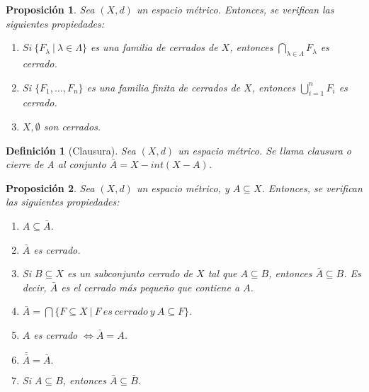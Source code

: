 \documentclass[11pt, a4paper, titlepage]{article}
\theoremstyle{theorem-style}
\newtheorem*{nprop}{Proposición}
\theoremstyle{definition-style}
\newtheorem*{ndef}{Definición}
\theoremstyle{remark-style}
\theoremstyle{example-style}
\newenvironment{nlist}
{\begin{enumerate}
\renewcommand\labelenumi{(\emph{\roman{enumi})}}}
{\end{enumerate}}
\begin{document}
\begin{nprop}
Sea $(X,d)$ un espacio métrico. Entonces, se verifican las siguientes propiedades:

\begin{nlist}
\item $Si\ \{F_\lambda \ | \ \lambda \in \Lambda \}$ es una familia de cerrados de $X$, entonces $\displaystyle \bigcap_{\lambda \in \Lambda} F_\lambda$ es cerrado.

\item Si $\{F_1,\dots, F_n\}$ es una familia finita de cerrados de $X$, entonces $\displaystyle \bigcup_{i=1}^n F_i$ es cerrado.

\item $X,\emptyset$ son cerrados.
\end{nlist}

\end{nprop}



\begin{ndef}[Clausura]
Sea $(X,d)$ un espacio métrico. Se llama \textit{clausura o cierre de A} al conjunto $\bar{A} = X - int(X-A)$.
\end{ndef}



\begin{nprop}
Sea $(X,d)$ un espacio métrico, y $A\subseteq X$. Entonces, se verifican las siguientes propiedades:
\begin{nlist}
\item $A \subseteq \bar{A}$.

\item $\bar{A}$ es cerrado.

\item Si $B\subseteq X$ es un subconjunto cerrado de $X$ tal que $A\subseteq B$, entonces $\bar{A} \subseteq B$. Es decir, $\bar{A}$ es el cerrado más pequeño que contiene a $A$.

\item $\displaystyle \bar{A}  = \bigcap \{ F\subseteq X \ | \ F\ es\ cerrado\ y\ A\subseteq F \}$.

\item $A$ es cerrado $\iff \bar{A} = A$.

\item $\bar{\bar{A}} = \bar{A}.$

\item Si $A\subseteq B$, entonces $\bar{A} \subseteq \bar{B}$.
\end{nlist}

\end{nprop}
\end{document}
